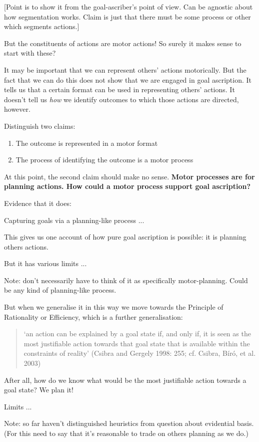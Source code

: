 \documentclass[12pt,\papersize]{extarticle}
\begin{document}
[Point is to show it from the goal-ascriber's point of view.
Can be agnostic about how segmentation works.
Claim is just that there must be some process or other which segments actions.]

But the constituents of actions are motor actions!
So surely it makes sense to start with these?

It may be important that we can represent others' actions motorically. 
But the fact that we can do this does not show that we are engaged in goal ascription.
It tells us that a certain format can be used in representing others' actions.
It doesn't tell us \emph{how} we identify outcomes to which those actions are directed, however.


Distinguish two claims:
\begin{enumerate}
\item The outcome is represented in a motor format
\item The process of identifying the outcome is a motor process
\end{enumerate}
%
At this point, the second claim should make no sense.
\textbf{Motor processes are for planning actions.
How could a motor process support goal ascription?}

Evidence that it does: \citep{ambrosini:2011_grasping,ambrosini:2012_tie} \citep{costantini:2012_out} \citep{Costantini:2012fk}

Capturing goals via a planning-like process ...

This gives us one account of how pure goal ascription is possible: it is planning others actions.

But it has various limits ...

Note: don't necessarily have to think of it as specifically motor-planning.  Could be any kind of planning-like process.

But when we generalise it in this way we move towards the Principle of Rationality or Efficiency, which is a further generalisation:
\begin{quote}
`an action can be explained by a goal state if, and only if, it is seen as the most justifiable action towards that goal state that is available within the constraints of reality' (Csibra and Gergely 1998: 255; cf. Csibra, Bíró, et al. 2003)
\end{quote}
%
After all, how do we know what would be the most justifiable action towards a goal state?  
We plan it!

Limits ...


Note: so far haven't distinguished heuristics from question about evidential basis.  (For this need to say that it's reasonable to trade on others planning as we do.)
\end{document}
